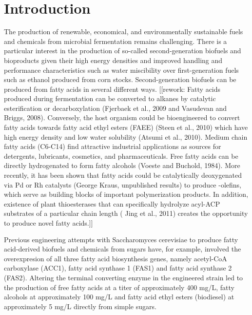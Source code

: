 \documentclass{bmcart}
\begin{document}
\section*{Introduction}
The production of renewable, economical, and environmentally sustainable fuels and chemicals from microbial fermentation remains challenging. There is a particular interest in the production of so-called second-generation biofuels and bioproducts given their high energy densities and improved handling and performance characteristics such as water miscibility over first-generation fuels such as ethanol produced from corn stocks. Second-generation biofuels can be produced from fatty acids in several different ways.  [[rework: Fatty acids produced during fermentation can be converted to alkanes by catalytic esterification or decarboxylation (Fjerbaek et al., 2009 and Vasudevan and Briggs, 2008). Conversely, the host organism could be bioengineered to convert fatty acids towards fatty acid ethyl esters (FAEE) (Steen et al., 2010) which have high energy density and low water solubility (Atsumi et al., 2010). Medium chain fatty acids (C6-C14) find attractive industrial applications as sources for detergents, lubricants, cosmetics, and pharmaceuticals. Free fatty acids can be directly hydrogenated to form fatty alcohols (Voeste and Buchold, 1984). More recently, it has been shown that fatty acids could be catalytically deoxygenated via Pd or Rh catalysts (George Kraus, unpublished results) to produce -olefins, which serve as building blocks of important polymerization products. In addition, existence of plant thioesterases that can specifically hydrolyze acyl-ACP substrates of a particular chain length ( Jing et al., 2011) creates the opportunity to produce novel fatty acids.]]


Previous engineering attempts with Saccharomyces cerevisiae to produce fatty acid-derived
biofuels and chemicals from sugars have, for example, involved the overexpresion of all three fatty acid biosynthesis
genes, namely acetyl-CoA carboxylase (ACC1), fatty acid synthase 1 (FAS1) and fatty acid synthase 2
(FAS2).  Altering the terminal converting enzyme in the engineered strain
led to the production of free fatty acids at a titer of approximately 400 mg/L, fatty alcohols at
approximately 100 mg/L and fatty acid ethyl esters (biodiesel) at approximately 5 mg/L directly from
simple sugars. 
\end{document}
